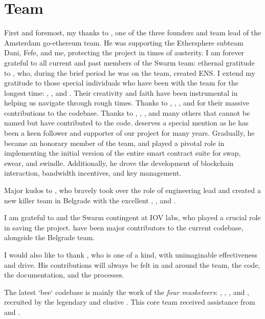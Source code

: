 \section*{Team}

First and foremost, my thanks to , one of the three founders and team lead of the Amsterdam go-ethereum team. He was supporting the Ethersphere subteam Dani, Fefe, and me, protecting the project in times of austerity.
I am forever grateful to all current and past members of the Swarm team: ethernal gratitude to , who, during the brief period he was on the team, created ENS. I extend my gratitude to those special individuals who have been with the team for the longest time: , , and . Their creativity and faith have been instrumental in helping us navigate through rough  times. Thanks to , , , and  for their massive contributions to the codebase. Thanks to , , , and many others that cannot be named but have contributed to the code.
 deserves a special mention as he has been a keen follower and supporter of our project for many years. Gradually, he became an honorary member of the team, and played a pivotal role in implementing the initial version of the entire smart contract suite for swap, swear, and swindle. Additionally, he drove the development of blockchain interaction, bandwidth incentives, and key management.

Major kudos to , who bravely took over the role of engineering lead and created a new killer team in Belgrade with the excellent , , and .  

I am grateful to  and the Swarm contingent at IOV labs, who played a crucial role in saving the project.  have been major contributors to the current codebase, alongside the Belgrade team. 

I would also like to thank , who is one of a kind, with unimaginable effectiveness and drive. His contributions will always be felt in and around the team, the code, the documentation, and the processes.

The latest `bee` codebase is mainly the work of the \emph{four musketeers}: , , , and , recruited by the legendary and elusive . This core team received assistance from  and .



